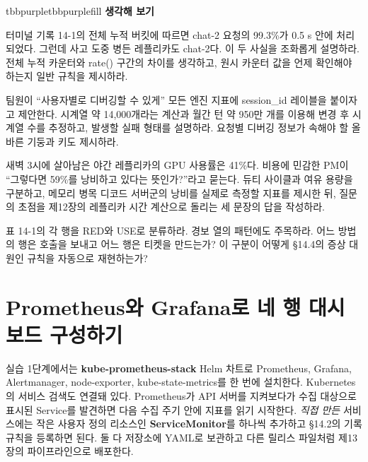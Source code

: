 \begin{calloutbox}{tbbpurple}{tbbpurplefill}
{\normalsize\bfseries\color{tbbpurple}생각해 보기}\par\vspace{3pt}
\begin{tbbitemize}
  \item 터미널 기록 14-1의 전체 누적 버킷에 따르면 chat-2 요청의 99.3\%가 0.5 s 안에 처리되었다. 그런데 사고 도중 병든 레플리카도 chat-2다. 이 두 사실을 조화롭게 설명하라. 전체 누적 카운터와 rate() 구간의 차이를 생각하고, 원시 카운터 값을 언제 확인해야 하는지 일반 규칙을 제시하라.
  \item 팀원이 “사용자별로 디버깅할 수 있게” 모든 엔진 지표에 session\_id 레이블을 붙이자고 제안한다. 시계열 약 14,000개라는 계산과 월간 턴 약 950만 개를 이용해 변경 후 시계열 수를 추정하고, 발생할 실패 형태를 설명하라. 요청별 디버깅 정보가 속해야 할 올바른 기둥과 키도 제시하라.
  \item 새벽 3시에 살아남은 야간 레플리카의 GPU 사용률은 41\%다. 비용에 민감한 PM이 “그렇다면 59\%를 낭비하고 있다는 뜻인가?”라고 묻는다. 듀티 사이클과 여유 용량을 구분하고, 메모리 병목 디코드 서버군의 낭비를 실제로 측정할 지표를 제시한 뒤, 질문의 초점을 제12장의 레플리카 시간 계산으로 돌리는 세 문장의 답을 작성하라.
  \item 표 14-1의 각 행을 RED와 USE로 분류하라. 경보 열의 패턴에도 주목하라. 어느 방법의 행은 호출을 보내고 어느 행은 티켓을 만드는가? 이 구분이 어떻게 §14.4의 증상 대 원인 규칙을 자동으로 재현하는가?
\end{tbbitemize}
\end{calloutbox}

\section{Prometheus와 Grafana로 네 행 대시보드 구성하기}

실습 1단계에서는 \textbf{kube-prometheus-stack} Helm 차트로 Prometheus, Grafana, Alertmanager, node-exporter, kube-state-metrics를 한 번에 설치한다. Kubernetes의 서비스 검색도 연결돼 있다. Prometheus가 API 서버를 지켜보다가 수집 대상으로 표시된 Service를 발견하면 다음 수집 주기 안에 지표를 읽기 시작한다. \textit{직접 만든} 서비스에는 작은 사용자 정의 리소스인 \textbf{ServiceMonitor}를 하나씩 추가하고 §14.2의 기록 규칙을 등록하면 된다. 둘 다 저장소에 YAML로 보관하고 다른 릴리스 파일처럼 제13장의 파이프라인으로 배포한다.

